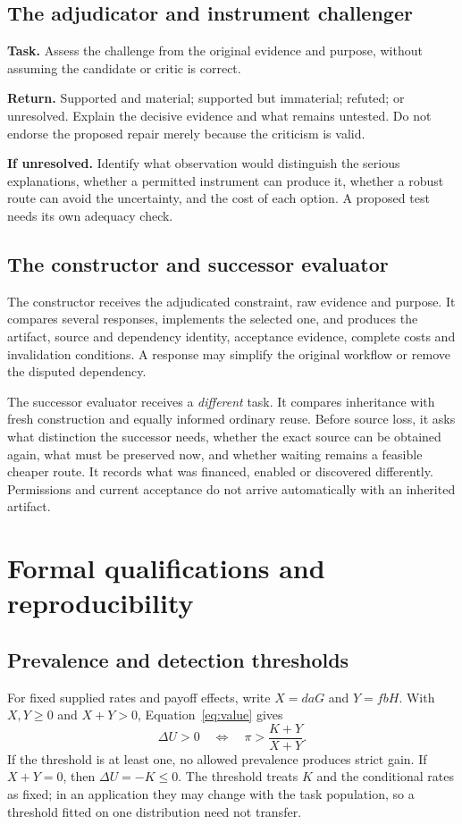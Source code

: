 \subsection{The adjudicator and instrument challenger}
\begin{statusbox}
\textbf{Task.} Assess the challenge from the original evidence and purpose, without assuming the candidate or critic is correct.\par
\textbf{Return.} Supported and material; supported but immaterial; refuted; or unresolved. Explain the decisive evidence and what remains untested. Do not endorse the proposed repair merely because the criticism is valid.\par
\textbf{If unresolved.} Identify what observation would distinguish the serious explanations, whether a permitted instrument can produce it, whether a robust route can avoid the uncertainty, and the cost of each option. A proposed test needs its own adequacy check.
\end{statusbox}

\subsection{The constructor and successor evaluator}
The constructor receives the adjudicated constraint, raw evidence and purpose. It compares several responses, implements the selected one, and produces the artifact, source and dependency identity, acceptance evidence, complete costs and invalidation conditions. A response may simplify the original workflow or remove the disputed dependency.

The successor evaluator receives a \emph{different} task. It compares inheritance with fresh construction and equally informed ordinary reuse. Before source loss, it asks what distinction the successor needs, whether the exact source can be obtained again, what must be preserved now, and whether waiting remains a feasible cheaper route. It records what was financed, enabled or discovered differently. Permissions and current acceptance do not arrive automatically with an inherited artifact.

\section{Formal qualifications and reproducibility}
\label{app:formal}
\subsection{Prevalence and detection thresholds}
For fixed supplied rates and payoff effects, write $X=daG$ and $Y=fbH$. With $X,Y\geq0$ and $X+Y>0$, Equation~\eqref{eq:value} gives
\begin{equation}
\Delta U>0\quad\Longleftrightarrow\quad \pi>\frac{K+Y}{X+Y}.
\end{equation}
If the threshold is at least one, no allowed prevalence produces strict gain. If $X+Y=0$, then $\Delta U=-K\leq0$. The threshold treats $K$ and the conditional rates as fixed; in an application they may change with the task population, so a threshold fitted on one distribution need not transfer.


